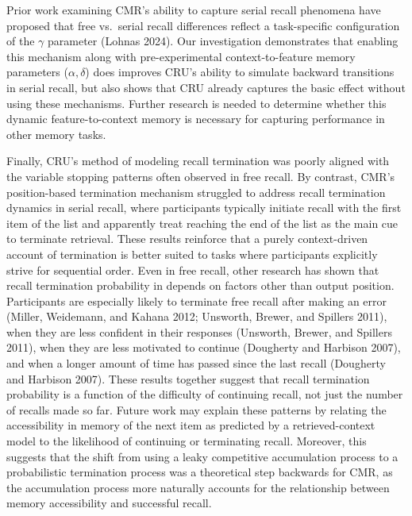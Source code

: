 \documentclass[
  letterpaper,
  DIV=11,
  numbers=noendperiod]{scrartcl}
\begin{document}
Prior work examining CMR's ability to capture serial recall phenomena
have proposed that free vs.~serial recall differences reflect a
task-specific configuration of the \(\gamma\) parameter (Lohnas 2024).
Our investigation demonstrates that enabling this mechanism along with
pre-experimental context-to-feature memory parameters
(\(\alpha, \delta\)) does improves CRU's ability to simulate backward
transitions in serial recall, but also shows that CRU already captures
the basic effect without using these mechanisms. Further research is
needed to determine whether this dynamic feature-to-context memory is
necessary for capturing performance in other memory tasks.

Finally, CRU's method of modeling recall termination was poorly aligned
with the variable stopping patterns often observed in free recall. By
contrast, CMR's position-based termination mechanism struggled to
address recall termination dynamics in serial recall, where participants
typically initiate recall with the first item of the list and apparently
treat reaching the end of the list as the main cue to terminate
retrieval. These results reinforce that a purely context-driven account
of termination is better suited to tasks where participants explicitly
strive for sequential order. Even in free recall, other research has
shown that recall termination probability in depends on factors other
than output position. Participants are especially likely to terminate
free recall after making an error (Miller, Weidemann, and Kahana 2012;
Unsworth, Brewer, and Spillers 2011), when they are less confident in
their responses (Unsworth, Brewer, and Spillers 2011), when they are
less motivated to continue (Dougherty and Harbison 2007), and when a
longer amount of time has passed since the last recall (Dougherty and
Harbison 2007). These results together suggest that recall termination
probability is a function of the difficulty of continuing recall, not
just the number of recalls made so far. Future work may explain these
patterns by relating the accessibility in memory of the next item as
predicted by a retrieved-context model to the likelihood of continuing
or terminating recall. Moreover, this suggests that the shift from using
a leaky competitive accumulation process to a probabilistic termination
process was a theoretical step backwards for CMR, as the accumulation
process more naturally accounts for the relationship between memory
accessibility and successful recall.
\end{document}
